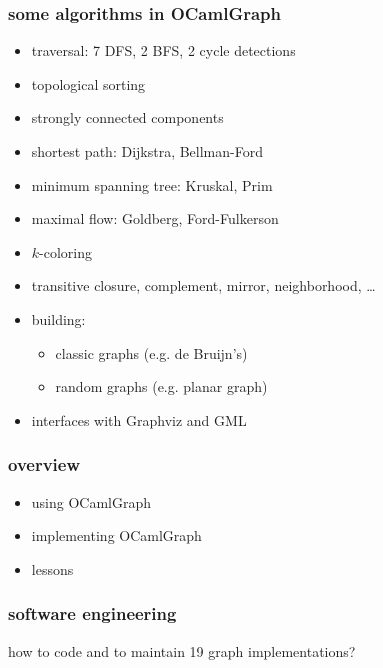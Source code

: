 \documentclass{beamer}
\newcommand{\ocamlgraph}{\textsf{OCamlGraph}}
\begin{document}
\begin{frame}
  \frametitle{some algorithms in \ocamlgraph}
  \begin{itemize}
  \item traversal: 7 DFS, 2 BFS, 2 cycle detections
  \item topological sorting
  \item strongly connected components
  \item shortest path: Dijkstra, Bellman-Ford
  \item minimum spanning tree: Kruskal, Prim
  \item maximal flow: Goldberg, Ford-Fulkerson
  \item $k$-coloring
  \item transitive closure, complement, mirror,
    neighborhood, \dots
  \item building:
    \begin{itemize}
    \item classic graphs (e.g. de Bruijn's)
    \item random graphs (e.g. planar graph)
    \end{itemize}
  \item interfaces with Graphviz and GML
\end{itemize}
\end{frame}



\begin{frame}
  \frametitle{overview}
  \begin{itemize}
  \item \textcolor{black!30}{using OCamlGraph\vskip15pt}
  \item implementing OCamlGraph\vskip15pt
  \item \textcolor{black!30}{lessons\vskip15pt}
  \end{itemize}
\end{frame}

\begin{frame}
  \frametitle{software engineering}
  \begin{center}
    how to code and to maintain 19 graph implementations?
  \end{center}
\end{frame}
\end{document}
